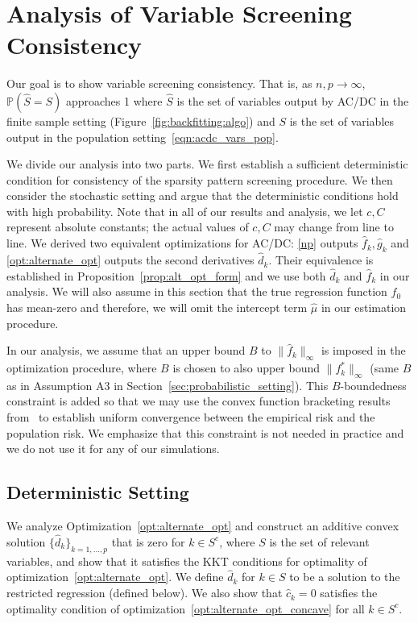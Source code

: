 \section{Analysis of Variable Screening Consistency}
\label{sec:finitesample}

Our goal is to show variable screening consistency. That is, as
$n,p \rightarrow \infty$, $\mathbb{P}( \hat{S} = S)$ approaches 1
where $\hat{S}$ is the set of variables output by AC/DC in the
finite sample setting (Figure~\ref{fig:backfitting:algo}) and $S$ is
the set of variables output in the population
setting~\eqref{eqn:acdc_vars_pop}.

We divide our analysis into two parts. We first establish a sufficient
deterministic condition for consistency of the sparsity pattern
screening procedure.  We then consider the stochastic setting and
argue that the deterministic conditions hold with high
probability. Note that in all of our results and analysis, we let $c,
C$ represent absolute constants; the actual values of $c,C$ may change
from line to line. We derived two equivalent optimizations for AC/DC:
\eqref{np} outputs $\hat{f}_k, \hat{g}_k$ and
\eqref{opt:alternate_opt} outputs the second derivatives
$\hat{d}_k$. Their equivalence is established in
Proposition~\ref{prop:alt_opt_form} and we use both $\hat{d}_k$ and
$\hat{f}_k$ in our analysis. We will also assume in this section that
the true regression function $f_0$ has mean-zero and therefore, we
will omit the intercept term $\hat{\mu}$ in our estimation
procedure.

In our analysis, we assume that an upper bound $B$ to $\| \hat{f}_k
\|_\infty$ is imposed in the optimization procedure, where $B$ is
chosen to also upper bound $\| f^*_k \|_\infty$ (same $B$ as in
Assumption A3 in Section~\ref{sec:probabilistic_setting}). This
$B$-boundedness constraint is added so that we may use the convex
function bracketing results from~\cite{kim2014global} to establish
uniform convergence between the empirical risk and the population
risk. We emphasize that this constraint is not needed in practice and
we do not use it for any of our simulations.


\subsection{Deterministic Setting}

We analyze Optimization~\ref{opt:alternate_opt} and construct an additive convex solution $\{\hat{d}_k\}_{k=1,\ldots,p}$
that is zero for $k \in S^c$, where $S$ is the set of relevant
variables, and show that it satisfies the KKT
conditions for optimality of optimization~\eqref{opt:alternate_opt}. We
define $\hat{d}_k$ for $k \in S$ to be a solution to the restricted
regression (defined below). We also show that $\hat{c}_k =
0$ satisfies the optimality condition of
optimization~\eqref{opt:alternate_opt_concave} for all $k \in S^c$.

